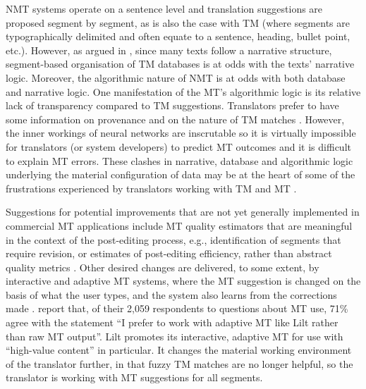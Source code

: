 \documentclass[output=paper,colorlinks,citecolor=brown]{langsci/langscibook}
\begin{document}
NMT systems operate on a sentence level and translation suggestions are proposed segment by segment, as is also the case with TM (where segments are typographically delimited and often equate to a sentence, heading, bullet point, etc.). However, as argued in \citet[51--54]{olohan_translation_2021}, since many texts follow a narrative structure, segment-based organisation of TM databases is at odds with the texts' narrative logic. Moreover, the algorithmic nature of NMT is at odds with both database and narrative logic. One manifestation of the MT’s algorithmic logic is its relative lack of transparency compared to TM suggestions. Translators prefer to have some information on provenance and on the nature of TM matches \citep{teixeira_impact_2014,cadwell_resistance_2018}. However, the inner workings of neural networks are inscrutable so it is virtually impossible for translators (or system developers) to predict MT outcomes and it is difficult to explain MT errors. These clashes in narrative, database and algorithmic logic underlying the material configuration of data may be at the heart of some of the frustrations experienced by translators working with TM and MT \citep[e.g.][]{moorkens_assessing_2017,leblanc_les_2014,cadwell_human_2016}. 

Suggestions for potential improvements that are not yet generally implemen\-ted in commercial MT applications include MT quality estimators that are meaningful in the context of the post-editing process, e.g., identification of segments that require revision, or estimates of post-editing efficiency, rather than abstract quality metrics \citep{stahlberg_neural_2019}. Other desired changes  are delivered, to some extent, by interactive and adaptive MT systems, where the MT suggestion is changed on the basis of what the user types, and the system also learns from the corrections made \citep{daems_interactive_2019,karimova_user-study_2018}. \citet[43]{pielmeier_state_2020} report that, of their 2,059 respondents to questions about MT use, 71\% agree with the statement \enquote{I prefer to work with adaptive MT like Lilt rather than raw MT output}. Lilt promotes its interactive, adaptive MT for use with \enquote{high-value content} in particular. It changes the material working environment of the translator further, in that fuzzy TM matches are no longer helpful, so the translator is working with MT suggestions for all segments.
\end{document}
